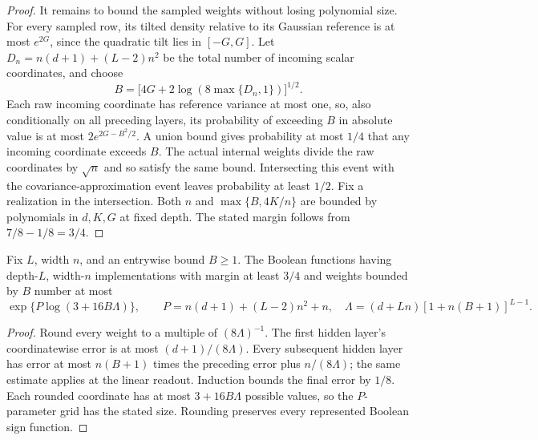 \begin{proof}
It remains to bound the sampled weights without losing polynomial size.
For every sampled row, its tilted density relative to its Gaussian reference
is at most $e^{2G}$, since the quadratic tilt lies in $[-G,G]$.
Let $D_n=n(d+1)+(L-2)n^2$ be the total number of incoming scalar coordinates,
and choose
\[
 B=\bigl[4G+2\log(8\max\{D_n,1\})\bigr]^{1/2}.
\]
Each raw incoming coordinate has reference variance at most one, so, also
conditionally on all preceding layers, its probability of exceeding $B$ in
absolute value is at most $2e^{2G-B^2/2}$.
A union bound gives probability at most $1/4$ that any incoming coordinate
exceeds $B$. The actual internal weights divide the raw coordinates by
$\sqrt n$ and so satisfy the same bound. Intersecting this event with the
covariance-approximation event leaves probability at least $1/2$.
Fix a realization in the intersection. Both $n$ and
$\max\{B,4K/n\}$ are bounded by
polynomials in $d,K,G$ at fixed depth. The stated margin follows from $7/8-1/8=3/4$.
\end{proof}

\begin{lemma}\label{lem:tilt-count}
Fix $L$, width $n$, and an entrywise bound $B\geq1$. The Boolean functions
having depth-$L$, width-$n$ implementations with margin at least $3/4$ and
weights bounded by $B$ number at most
\[
 \exp\{P\log(3+16B\Lambda)\},\qquad
 P=n(d+1)+(L-2)n^2+n,
 \quad \Lambda=(d+Ln)[1+n(B+1)]^{L-1}.
\]
\end{lemma}
\begin{proof}
Round every weight to a multiple of $(8\Lambda)^{-1}$.
The first hidden layer's coordinatewise error is at most $(d+1)/(8\Lambda)$.
Every subsequent hidden layer has error at most $n(B+1)$ times the preceding
error plus $n/(8\Lambda)$; the same estimate applies at the linear readout.
Induction bounds the final error by $1/8$. Each rounded coordinate has at
most $3+16B\Lambda$ possible values, so the $P$-parameter grid has the stated
size. Rounding preserves every represented Boolean sign function.
\end{proof}
